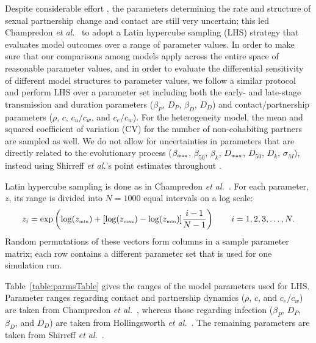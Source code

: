 \documentclass[10pt,letterpaper]{article}
\newcommand{\etal}{\textit{et al.}}
\newcommand{\tsub}[2]{#1_{{\textrm{\tiny #2}}}}
\begin{document}
Despite considerable effort \cite{hollingsworth_hiv1_2008,champredon_hiv_2013}, the parameters determining the rate and structure of sexual partnership change and contact are still very uncertain; this led Champredon \etal\ \cite{champredon_hiv_2013} to adopt a Latin hypercube sampling (LHS) strategy \cite{blower_drugs_1991} that evaluates model outcomes over a range of parameter values. In order to make sure that our comparisons among models apply across the entire space of reasonable parameter values, and in order to evaluate the differential sensitivity of different model structures to parameter values, we follow a similar protocol and perform LHS over a parameter set including both the early- and late-stage transmission and duration parameters ($\beta_P$, $D_P$, $\beta_D$, $D_D$) and contact/partnership parameters ($\rho$, $c$, $c_u/c_w$, and $c_e/c_w$). For the heterogeneity model, the mean and squared coefficient of variation (CV) for the number of non-cohabiting partners are sampled as well. We do not allow for uncertainties in parameters that are directly related to the evolutionary process ($\tsub{\beta}{max}$, $\beta_{50}$, $\beta_k$, $\tsub{D}{max}$, $D_{50}$, $D_k$, $\sigma_M$), instead using Shirreff \etal's point estimates throughout \cite{shirreff_transmission_2011}.

Latin hypercube sampling is done as in Champredon \etal\ \cite{champredon_hiv_2013}. For each parameter, $z$, its range is divided into $N = 1000$ equal intervals on a log scale:
\begin{equation}
z_i = \exp\left(\log(\tsub{z}{min}) + [\log(\tsub{z}{max}) - \log(\tsub{z}{min})] \frac{i-1}{N-1}\right) \qquad i = 1, 2, 3, \dots,N.
\end{equation}
Random permutations of these vectors form columns in a sample parameter matrix; each row contains a different parameter set that is used for one simulation run.

Table~\ref{table:parmsTable} gives the ranges of the model parameters used for LHS. Parameter ranges regarding contact and partnership dynamics ($\rho$, $c$, and $c_e/c_w$) are taken from Champredon \etal\ \cite{champredon_hiv_2013}, whereas those regarding infection ($\beta_P$, $D_P$, $\beta_D$, and $D_D$) are taken from Hollingsworth \etal\ \cite{hollingsworth_hiv1_2008}. The remaining parameters are taken from Shirreff \etal\ \cite{shirreff_transmission_2011}.
\end{document}
